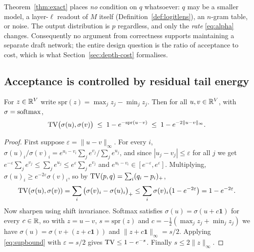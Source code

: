 \begin{remark}
\label{rem:free}
Theorem~\ref{thm:exact} places \emph{no} condition on $q$ whatsoever: $q$ may be a
smaller model, a layer-$\ell$ readout of $M$ itself
(Definition~\ref{def:logitlens}), an $n$-gram table, or noise. The output
distribution is $p$ regardless, and only the \emph{rate}
\eqref{eq:alpha} changes. Consequently no argument from correctness supports
maintaining a separate draft network; the entire design question is the ratio of
acceptance to cost, which is what Section~\ref{sec:depth-cost} formalises.
\end{remark}

\subsection{Acceptance is controlled by residual tail energy}

\begin{lemma}
\label{lem:softmax}
For $z \in \mathbb{R}^{V}$ write $\mathrm{spr}(z) = \max_j z_j - \min_j z_j$. Then for all
$u,v \in \mathbb{R}^{V}$, with $\sigma = \mathrm{softmax}$,
\begin{equation}
  \mathrm{TV}\big(\sigma(u), \sigma(v)\big) \;\le\; 1 - e^{-\mathrm{spr}(u-v)}
  \;\le\; 1 - e^{-2\|u-v\|_\infty} .
\end{equation}
\end{lemma}

\begin{proof}
First suppose $\varepsilon = \|u-v\|_\infty$. For every $i$,
$\sigma(u)_i/\sigma(v)_i = e^{u_i-v_i}\sum_j e^{v_j} / \sum_j e^{u_j}$, and since
$|u_j-v_j|\le\varepsilon$ for all $j$ we get
$e^{-\varepsilon}\sum_j e^{v_j} \le \sum_j e^{u_j} \le e^{\varepsilon}\sum_j e^{v_j}$
and $e^{u_i-v_i}\in[e^{-\varepsilon},e^{\varepsilon}]$. Multiplying,
$\sigma(u)_i \ge e^{-2\varepsilon}\sigma(v)_i$, so by
$\mathrm{TV}(p,q) = \sum_i (q_i-p_i)_+$,
\begin{equation}
  \mathrm{TV}(\sigma(u),\sigma(v)) = \sum_i\big(\sigma(v)_i-\sigma(u)_i\big)_+
  \le \sum_i \sigma(v)_i\big(1-e^{-2\varepsilon}\big) = 1-e^{-2\varepsilon}.
  \label{eq:supbound}
\end{equation}
Now sharpen using shift invariance. Softmax satisfies
$\sigma(u) = \sigma(u + c\mathbf{1})$ for every $c\in\mathbb{R}$, so with
$z = u-v$, $s = \mathrm{spr}(z)$ and $c = -\tfrac12(\max_j z_j + \min_j z_j)$ we
have $\sigma(u) = \sigma(v + (z + c\mathbf{1}))$ and
$\|z + c\mathbf{1}\|_\infty = s/2$. Applying \eqref{eq:supbound} with
$\varepsilon = s/2$ gives $\mathrm{TV} \le 1 - e^{-s}$. Finally
$s \le 2\|z\|_\infty$.
\end{proof}

